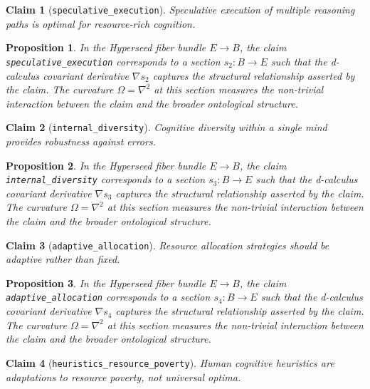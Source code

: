 \documentclass{article}
\newtheorem{claim}{Claim}
\newtheorem{proposition}{Proposition}
\begin{document}
\begin{claim}[\texttt{speculative_execution}]
Speculative execution of multiple reasoning paths is optimal for resource-rich cognition.
\end{claim}

\begin{proposition}
In the Hyperseed fiber bundle $E \to B$, the claim \texttt{speculative_execution} corresponds to a section $s_2: B \to E$ such that the d-calculus covariant derivative $\nabla s_2$ captures the structural relationship asserted by the claim. The curvature $\Omega = \nabla^2$ at this section measures the non-trivial interaction between the claim and the broader ontological structure.
\end{proposition}

\begin{claim}[\texttt{internal_diversity}]
Cognitive diversity within a single mind provides robustness against errors.
\end{claim}

\begin{proposition}
In the Hyperseed fiber bundle $E \to B$, the claim \texttt{internal_diversity} corresponds to a section $s_3: B \to E$ such that the d-calculus covariant derivative $\nabla s_3$ captures the structural relationship asserted by the claim. The curvature $\Omega = \nabla^2$ at this section measures the non-trivial interaction between the claim and the broader ontological structure.
\end{proposition}

\begin{claim}[\texttt{adaptive_allocation}]
Resource allocation strategies should be adaptive rather than fixed.
\end{claim}

\begin{proposition}
In the Hyperseed fiber bundle $E \to B$, the claim \texttt{adaptive_allocation} corresponds to a section $s_4: B \to E$ such that the d-calculus covariant derivative $\nabla s_4$ captures the structural relationship asserted by the claim. The curvature $\Omega = \nabla^2$ at this section measures the non-trivial interaction between the claim and the broader ontological structure.
\end{proposition}

\begin{claim}[\texttt{heuristics_resource_poverty}]
Human cognitive heuristics are adaptations to resource poverty, not universal optima.
\end{claim}
\end{document}

